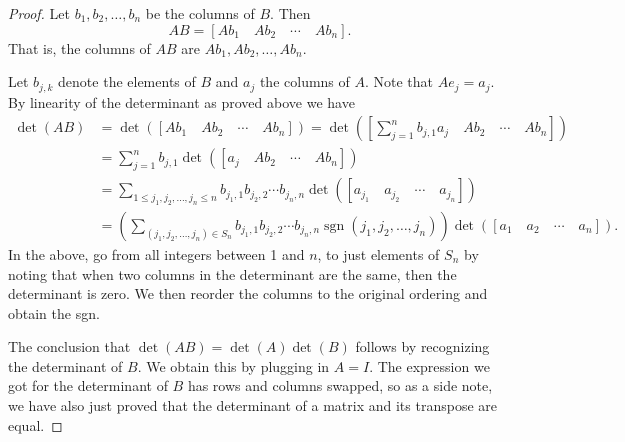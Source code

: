 \documentclass[12pt]{book}
\theoremstyle{plain}
\theoremstyle{remark}
\theoremstyle{definition}
\theoremstyle{exercise}
\theoremstyle{example}
\begin{document}
\begin{proof}
Let $b_1,b_2,\ldots,b_n$ be the columns of $B$.  Then
\begin{equation*}
AB = [ Ab_1 \quad Ab_2 \quad  \cdots \quad  Ab_n ] .
\end{equation*}
That is, the columns of $AB$ are
$Ab_1,Ab_2,\ldots,Ab_n$.

Let $b_{j,k}$ denote the elements of $B$ and
$a_j$ the columns of $A$.  Note that $Ae_j = a_j$.
By linearity of the determinant as proved above we have
\begin{equation*}
\begin{split}
\det(AB) & =  
\det ([ Ab_1 \quad Ab_2 \quad  \cdots \quad  Ab_n ]) =
\det \left(\left[ \sum_{j=1}^n b_{j,1} a_j \quad Ab_2 \quad  \cdots \quad  Ab_n \right]\right) \\
& =
\sum_{j=1}^n
b_{j,1}
\det ([ a_j \quad Ab_2 \quad  \cdots \quad  Ab_n ]) \\
& =
\sum_{1 \leq j_1,j_2,\ldots,j_n \leq n}
b_{j_1,1}
b_{j_2,2}
\cdots
b_{j_n,n}
\det ([ a_{j_1} \quad a_{j_2} \quad  \cdots \quad  a_{j_n} ]) \\
& =
\left(
\sum_{(j_1,j_2,\ldots,j_n) \in S_n}
b_{j_1,1}
b_{j_2,2}
\cdots
b_{j_n,n}
\operatorname{sgn}(j_1,j_2,\ldots,j_n)
\right)
\det ([ a_{1} \quad a_{2} \quad  \cdots \quad  a_{n} ]) .
\end{split}
\end{equation*}
In the above, go from all integers between 1 and $n$,
to just elements of $S_n$ by noting that
when two columns in the determinant are the same, then the
determinant is zero.  We then reorder the columns to the
original ordering and obtain the sgn.

The conclusion that $\det(AB) = \det(A)\det(B)$
follows by recognizing the determinant of $B$.  
We obtain this by plugging in $A=I$.
The expression we got for the determinant of $B$ has rows and columns
swapped, so as a side note, we have also just proved that the determinant of
a matrix and its transpose are equal.


\end{proof}
\end{document}
